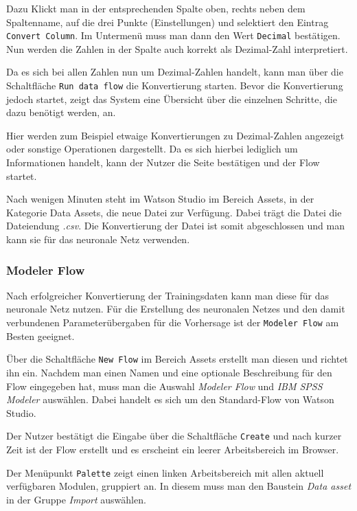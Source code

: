 Dazu Klickt man in der entsprechenden Spalte oben, rechts neben dem Spaltenname, auf die drei Punkte (Einstellungen) und
selektiert den Eintrag \texttt{Convert Column}. Im Untermenü muss man dann den Wert \texttt{Decimal} bestätigen. Nun
werden die Zahlen in der Spalte auch korrekt als Dezimal-Zahl interpretiert.

Da es sich bei allen Zahlen nun um Dezimal-Zahlen handelt, kann man über die Schaltfläche \texttt{Run data flow} die
Konvertierung starten. Bevor die Konvertierung jedoch startet, zeigt das System eine Übersicht über die einzelnen
Schritte, die dazu benötigt werden, an.

Hier werden zum Beispiel etwaige Konvertierungen zu Dezimal-Zahlen angezeigt oder sonstige Operationen dargestellt. Da
es sich hierbei lediglich um Informationen handelt, kann der Nutzer die Seite bestätigen und der Flow startet.

Nach wenigen Minuten steht im Watson Studio im Bereich Assets, in der Kategorie Data Assets, die neue Datei zur
Verfügung. Dabei trägt die Datei die Dateiendung \textit{.csv}. Die Konvertierung der Datei ist somit abgeschlossen und
man kann sie für das neuronale Netz verwenden.

\subsubsection{Modeler Flow}
\label{subsub:modeler_flow}
Nach erfolgreicher Konvertierung der Trainingsdaten kann man diese für das neuronale Netz nutzen. Für die Erstellung
des neuronalen Netzes und den damit verbundenen Parameterübergaben für die Vorhersage ist der \texttt{Modeler Flow} am
Besten geeignet.

Über die Schaltfläche \texttt{New Flow} im Bereich Assets erstellt man diesen und richtet ihn ein. Nachdem man einen
Namen und eine optionale Beschreibung für den Flow eingegeben hat, muss man die Auswahl \textit{Modeler Flow} und
\textit{IBM SPSS Modeler} auswählen. Dabei handelt es sich um den Standard-Flow von Watson Studio.

Der Nutzer bestätigt die Eingabe über die Schaltfläche \texttt{Create} und nach kurzer Zeit ist der Flow erstellt und es
erscheint ein leerer Arbeitsbereich im Browser.

Der Menüpunkt \texttt{Palette} zeigt einen linken Arbeitsbereich mit allen aktuell verfügbaren Modulen, gruppiert an. In
diesem muss man den Baustein \textit{Data asset} in der Gruppe \textit{Import} auswählen.

